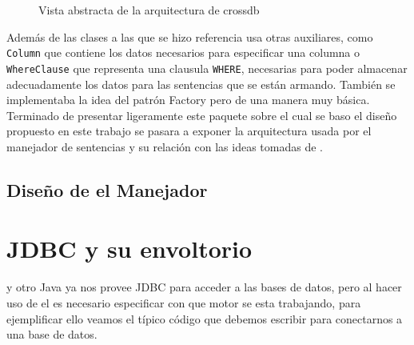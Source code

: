 \begin{figure}
  \centering
   \label{fig:subfig:crossdb:base-idea}
  \qquad 
   \label{fig:subfig:crossdb:base-idea-select}
  \caption{Vista abstracta de la arquitectura de crossdb}
  \label{fig:crossdb:base-idea}
\end{figure}

Además de las clases a las que se hizo referencia \cc usa otras auxiliares, como \verb=Column= que contiene los datos necesarios para especificar una columna o \verb=WhereClause= que representa una clausula \verb=WHERE=, necesarias para poder almacenar adecuadamente los datos para las sentencias que se están armando. También se implementaba la idea del patrón Factory pero de una manera muy básica. Terminado de presentar ligeramente este paquete sobre el cual se baso el diseño propuesto en este trabajo se pasara a exponer la arquitectura usada por el manejador de sentencias y su relación con las ideas tomadas de \cc.

\subsection{Diseño de el Manejador}


\section{JDBC y su envoltorio}
y otro
Java ya nos provee JDBC para acceder a las bases de datos, pero al hacer uso de el es necesario especificar con que motor se esta trabajando, para ejemplificar ello veamos el típico código que debemos escribir para conectarnos a una base de datos.

